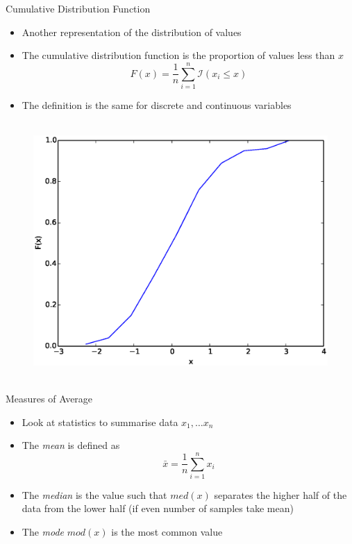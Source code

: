 \documentclass{beamer}
\begin{document}
\begin{frame}{Cumulative Distribution Function}  
\begin{itemize} 
 \item Another representation of the distribution of values 
\item The cumulative distribution function is the proportion of values less than $x$
\begin{displaymath}
 F(x) = \frac{1}{n}\sum_{i=1}^n \mathcal{I}(x_i \leq x)
\end{displaymath}
\item The definition is the same for discrete and continuous variables 
\end{itemize}
 \begin{figure}[htp]
\mbox{
\includegraphics[width=0.5\linewidth]{ContinuousCDF.eps}
}
\end{figure} 
\end{frame}

\begin{frame}{Measures of Average}
\begin{itemize} 
 \item Look at statistics to summarise data $x_1, \ldots x_n$
  \item The \emph{mean} is defined as 
  \begin{displaymath}
   \bar{x} = \frac{1}{n}\sum_{i=1}^n x_i
  \end{displaymath}
\item The \emph{median} is the value such that $med(x)$ separates the higher half of the data from the lower half (if even number of samples take mean) 
\item The \emph{mode} $mod(x)$ is the most common value  
\end{itemize}
\end{frame}
\end{document}
